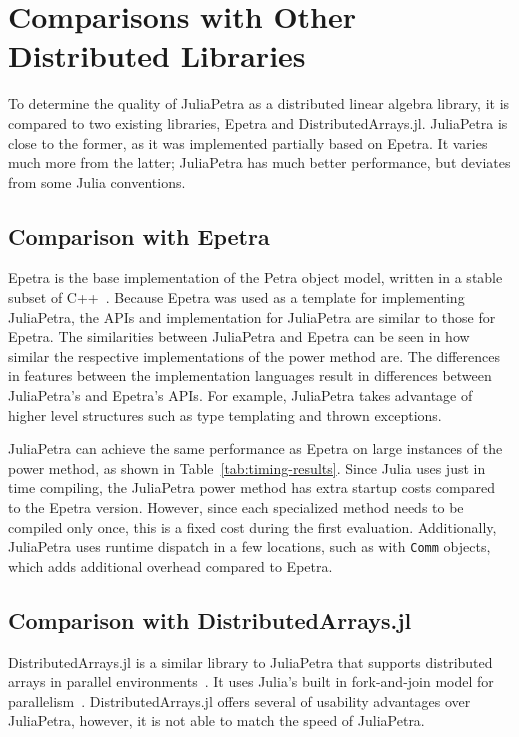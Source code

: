 \documentclass[acmsmall]{acmart}
\newcommand{\snippet}[1]{\lstinline{#1}}
\begin{document}
	\section{Comparisons with Other Distributed Libraries}
	
	To determine the quality of JuliaPetra as a distributed linear algebra library, it is compared to two existing libraries, Epetra and DistributedArrays.jl.
	JuliaPetra is close to the former, as it was implemented partially based on Epetra.
	It varies much more from the latter; JuliaPetra has much better performance, but deviates from some Julia conventions.
	
	\subsection{Comparison with Epetra}
	
	Epetra is the base implementation of the Petra object model,
	written in a stable subset of C++~\cite{Heroux:2005:Trilinos}.
	Because Epetra was used as a template for implementing JuliaPetra,
	the APIs and implementation for JuliaPetra are similar to those for Epetra.
	The similarities between JuliaPetra and Epetra can be seen in how similar the respective implementations
	of the power method are.
	The differences in features between the implementation languages result in differences
	between JuliaPetra's and Epetra's APIs.
	For example, JuliaPetra takes advantage of higher level structures
	such as type templating and thrown exceptions.
	
	JuliaPetra can achieve the same performance as Epetra on large instances of the power method, as shown in Table~\ref{tab:timing-results}.
	Since Julia uses just in time compiling, the JuliaPetra power method has extra startup costs compared to
	the Epetra version. However, since each specialized method needs to be compiled only once,
	this is a fixed cost during the first evaluation.
	Additionally, JuliaPetra uses runtime dispatch in a few locations, such as with
	\snippet{Comm} objects, which adds additional overhead compared to Epetra.
	
	\subsection{Comparison with DistributedArrays.jl}
	
	DistributedArrays.jl is a similar library to JuliaPetra that supports
	distributed arrays in parallel environments~\cite{Github:DA}.
	It uses Julia's built in fork-and-join model for parallelism~\cite{Bezanson:2017:FreshApproach}.
	DistributedArrays.jl offers several of usability advantages over JuliaPetra, however, it is not able to match the speed of JuliaPetra.
	
\end{document}
